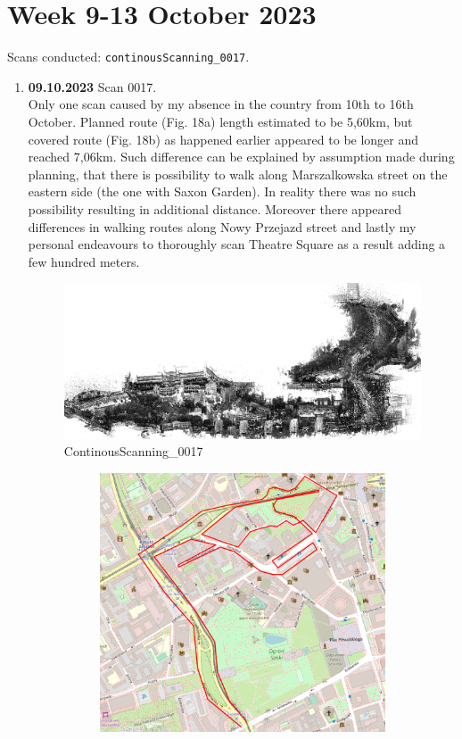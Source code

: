 \documentclass[a4paper,12pt]{book}
\begin{document}
\section{Week 9-13 October 2023}
Scans conducted: \verb|continousScanning_0017|.\\
\begin{enumerate}
	\item \textbf{09.10.2023} Scan 0017. \\
	Only one scan caused by my absence in the country from 10th to 16th October. Planned route (Fig. 18a) length estimated to be 5,60km, but covered route (Fig. 18b) as happened earlier appeared to be longer and reached 7,06km. Such difference can be explained by assumption made during planning, that there is possibility to walk along Marszalkowska street on the eastern side (the one with Saxon Garden). In reality there was no such possibility resulting in additional distance. Moreover there appeared differences in walking routes along Nowy Przejazd street and lastly my personal endeavours to thoroughly scan Theatre Square as a result adding a few hundred meters.
	\begin{figure}[H]
		\includegraphics[width=1\linewidth]{cloud17}
		\caption{ContinousScanning\_0017}
	\end{figure}
	\begin{figure}[H]
		\centering
		\begin{subfigure}{.75\textwidth}
			\centering
			\includegraphics[width=1\linewidth]{route_p17}

\end{subfigure}
\end{figure}
\end{enumerate}
\end{document}
